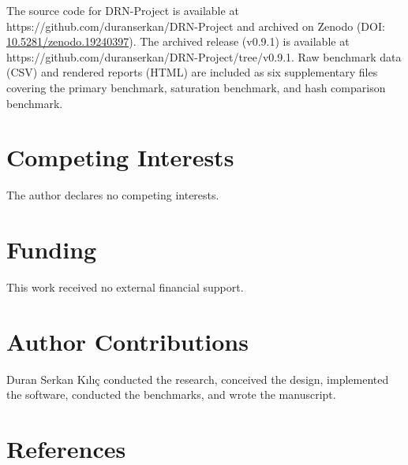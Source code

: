 \documentclass[fleqn,10pt,lineno]{wlpeerj}
\begin{document}
The source code for DRN-Project is available at
https://github.com/duranserkan/DRN-Project and archived on Zenodo (DOI:
\href{https://doi.org/10.5281/zenodo.19240397}{10.5281/zenodo.19240397}).
The archived release (v0.9.1) is available at
https://github.com/duranserkan/DRN-Project/tree/v0.9.1. Raw benchmark
data (CSV) and rendered reports (HTML) are included as six supplementary
files covering the primary benchmark, saturation benchmark, and hash
comparison benchmark.

\section{Competing Interests}\label{competing-interests}

The author declares no competing interests.

\section{Funding}\label{funding}

This work received no external financial support.

\section{Author Contributions}\label{author-contributions}

Duran Serkan Kılıç conducted the research, conceived the design,
implemented the software, conducted the benchmarks, and wrote the
manuscript.

\newpage

\section*{References}\label{references}
\end{document}
